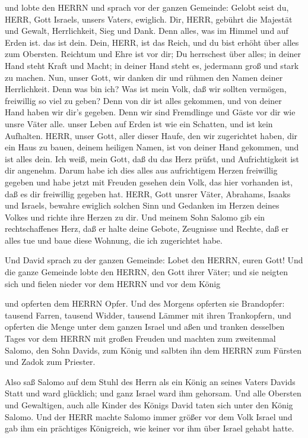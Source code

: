  und lobte den HERRN und sprach vor der ganzen Gemeinde:
Gelobt seist du, HERR, Gott Israels, unsers Vaters, ewiglich.
 Dir, HERR, gebührt die Majestät und Gewalt, Herrlichkeit,
Sieg und Dank. Denn alles, was im Himmel und auf Erden ist. das ist
dein. Dein, HERR, ist das Reich, und du bist erhöht über alles zum
Obersten.  Reichtum und Ehre ist vor dir; Du herrschest
über alles; in deiner Hand steht Kraft und Macht; in deiner Hand steht
es, jedermann groß und stark zu machen.  Nun, unser Gott,
wir danken dir und rühmen den Namen deiner Herrlichkeit. 
Denn was bin ich? Was ist mein Volk, daß wir sollten vermögen,
freiwillig so viel zu geben? Denn von dir ist alles gekommen, und von
deiner Hand haben wir dir's gegeben.  Denn wir sind
Fremdlinge und Gäste vor dir wie unsre Väter alle. unser Leben auf Erden
ist wie ein Schatten, und ist kein Aufhalten.  HERR, unser
Gott, aller dieser Haufe, den wir zugerichtet haben, dir ein Haus zu
bauen, deinem heiligen Namen, ist von deiner Hand gekommen, und ist
alles dein.  Ich weiß, mein Gott, daß du das Herz prüfst,
und Aufrichtigkeit ist dir angenehm. Darum habe ich dies alles aus
aufrichtigem Herzen freiwillig gegeben und habe jetzt mit Freuden
gesehen dein Volk, das hier vorhanden ist, daß es dir freiwillig gegeben
hat.  HERR, Gott unsrer Väter, Abrahams, Isaaks und
Israels, bewahre ewiglich solchen Sinn und Gedanken im Herzen deines
Volkes und richte ihre Herzen zu dir.  Und meinem Sohn
Salomo gib ein rechtschaffenes Herz, daß er halte deine Gebote,
Zeugnisse und Rechte, daß er alles tue und baue diese Wohnung, die ich
zugerichtet habe.

 Und David sprach zu der ganzen Gemeinde: Lobet den HERRN,
euren Gott! Und die ganze Gemeinde lobte den HERRN, den Gott ihrer
Väter; und sie neigten sich und fielen nieder vor dem HERRN und vor dem
König

 und opferten dem HERRN Opfer. Und des Morgens opferten sie
Brandopfer: tausend Farren, tausend Widder, tausend Lämmer mit ihren
Trankopfern, und opferten die Menge unter dem ganzen Israel
 und aßen und tranken desselben Tages vor dem HERRN mit
großen Freuden und machten zum zweitenmal Salomo, den Sohn Davids, zum
König und salbten ihn dem HERRN zum Fürsten und Zadok zum Priester.

 Also saß Salomo auf dem Stuhl des Herrn als ein König an
seines Vaters Davids Statt und ward glücklich; und ganz Israel ward ihm
gehorsam.  Und alle Obersten und Gewaltigen, auch alle
Kinder des Königs David taten sich unter den König Salomo. 
Und der HERR machte Salomo immer größer vor dem Volk Israel und gab ihm
ein prächtiges Königreich, wie keiner vor ihm über Israel gehabt hatte.

